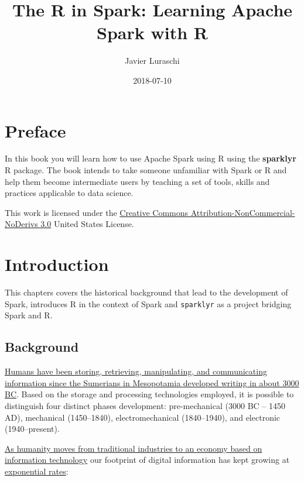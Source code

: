 \documentclass[]{book}
\title{The R in Spark: Learning Apache Spark with R}
\author{Javier Luraschi}
\date{2018-07-10}
\theoremstyle{definition}
\theoremstyle{definition}
\theoremstyle{definition}
\theoremstyle{remark}
\begin{document}
\maketitle

{
\setcounter{tocdepth}{1}
\tableofcontents
}
\hypertarget{preface}{%
\chapter*{Preface}\label{preface}}

In this book you will learn how to use Apache Spark using R using the
\textbf{sparklyr} R package. The book intends to take someone unfamiliar
with Spark or R and help them become intermediate users by teaching a
set of tools, skills and practices applicable to data science.

This work is licensed under the
\href{http://creativecommons.org/licenses/by-nc-nd/3.0/us/}{Creative
Commons Attribution-NonCommercial-NoDerivs 3.0} United States License.

\hypertarget{intro}{%
\chapter{Introduction}\label{intro}}

This chapters covers the historical background that lead to the
development of Spark, introduces R in the context of Spark and
\texttt{sparklyr} as a project bridging Spark and R.

\hypertarget{background}{%
\section{Background}\label{background}}

\href{https://en.wikipedia.org/wiki/Information_technology}{Humans have
been storing, retrieving, manipulating, and communicating information
since the Sumerians in Mesopotamia developed writing in about 3000 BC}.
Based on the storage and processing technologies employed, it is
possible to distinguish four distinct phases development: pre-mechanical
(3000 BC -- 1450 AD), mechanical (1450--1840), electromechanical
(1840--1940), and electronic (1940--present).

\href{https://en.wikipedia.org/wiki/Information_Age}{As humanity moves
from traditional industries to an economy based on information
technology} our footprint of digital information has kept growing at
\href{http://documents.worldbank.org/curated/en/896971468194972881/310436360_201602630200201/additional/102725-PUB-Replacement-PUBLIC.pdf}{exponential
rates}:
\end{document}
